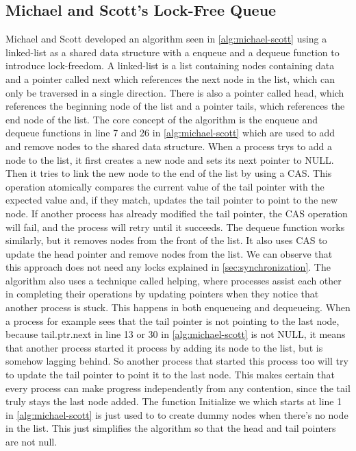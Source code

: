 \subsection{Michael and Scott's Lock-Free Queue}\label{subsec:michael-scott}

Michael and Scott developed an algorithm seen in \cref{alg:michael-scott} using a linked-list as a shared data structure with a enqueue and a dequeue function to introduce lock-freedom. A linked-list is a list containing nodes containing data and a pointer called next which references the next node in the list, which can only be traversed in a single direction. There is also a pointer called head, which references the beginning node of the list and a pointer tails, which references the end node of the list. The core concept of the algorithm is the enqueue and dequeue functions in line 7 and 26 in \cref{alg:michael-scott} which are used to add and remove nodes to the shared data structure. When a process trys to add a node to the list, it first creates a new node and sets its next pointer to NULL. Then it tries to link the new node to the end of the list by using a \ac{CAS}. This operation atomically compares the current value of the tail pointer with the expected value and, if they match, updates the tail pointer to point to the new node. If another process has already modified the tail pointer, the \ac{CAS} operation will fail, and the process will retry until it succeeds. The dequeue function works similarly, but it removes nodes from the front of the list. It also uses \ac{CAS} to update the head pointer and remove nodes from the list. We can observe that this approach does not need any locks explained in \cref{sec:synchronization}. \cite{MichaelScottQueue}
The algorithm also uses a technique called helping, where processes assist each other in completing their operations by updating pointers when they notice that another process is stuck. This happens in both enqueueing and dequeueing. When a process for example sees that the tail pointer is not pointing to the last node, because tail.ptr.next in line 13 or 30 in \cref{alg:michael-scott} is not NULL, it means that another process started it process by adding its node to the list, but is somehow lagging behind. So another process that started this process too will try to update the tail pointer to point it to the last node. This makes certain that every process can make progress independently from any contention, since the tail truly stays the last node added. \cite{MichaelScottQueue}
The function Initialize we which starts at line 1 in \cref{alg:michael-scott} is just used to to create dummy nodes when there's no node in the list. This just simplifies the algorithm so that the head and tail pointers are not null. \cite{MichaelScottQueue}

